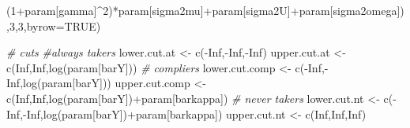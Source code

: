 \documentclass[
]{book}
\newenvironment{Shaded}{\begin{snugshade}}{\end{snugshade}}
\newcommand{\AttributeTok}[1]{\textcolor[rgb]{0.77,0.63,0.00}{#1}}
\newcommand{\CommentTok}[1]{\textcolor[rgb]{0.56,0.35,0.01}{\textit{#1}}}
\newcommand{\ConstantTok}[1]{\textcolor[rgb]{0.00,0.00,0.00}{#1}}
\newcommand{\DecValTok}[1]{\textcolor[rgb]{0.00,0.00,0.81}{#1}}
\newcommand{\FunctionTok}[1]{\textcolor[rgb]{0.00,0.00,0.00}{#1}}
\newcommand{\NormalTok}[1]{#1}
\newcommand{\OtherTok}[1]{\textcolor[rgb]{0.56,0.35,0.01}{#1}}
\newcommand{\SpecialCharTok}[1]{\textcolor[rgb]{0.00,0.00,0.00}{#1}}
\newcommand{\StringTok}[1]{\textcolor[rgb]{0.31,0.60,0.02}{#1}}
\theoremstyle{definition}
\theoremstyle{definition}
\theoremstyle{definition}
\theoremstyle{definition}
\theoremstyle{remark}
\begin{document}
\begin{Shaded}
\begin{Highlighting}[]
\NormalTok{                          (}\DecValTok{1}\SpecialCharTok{+}\NormalTok{param[}\StringTok{\textquotesingle{}gamma\textquotesingle{}}\NormalTok{]}\SpecialCharTok{\^{}}\DecValTok{2}\NormalTok{)}\SpecialCharTok{*}\NormalTok{param[}\StringTok{\textquotesingle{}sigma2mu\textquotesingle{}}\NormalTok{]}\SpecialCharTok{+}\NormalTok{param[}\StringTok{\textquotesingle{}sigma2U\textquotesingle{}}\NormalTok{]}\SpecialCharTok{+}\NormalTok{param[}\StringTok{\textquotesingle{}sigma2omega\textquotesingle{}}\NormalTok{]),}\DecValTok{3}\NormalTok{,}\DecValTok{3}\NormalTok{,}\AttributeTok{byrow=}\ConstantTok{TRUE}\NormalTok{)}



\CommentTok{\# cuts}
\CommentTok{\#always takers}
\NormalTok{lower.cut.at }\OtherTok{\textless{}{-}} \FunctionTok{c}\NormalTok{(}\SpecialCharTok{{-}}\ConstantTok{Inf}\NormalTok{,}\SpecialCharTok{{-}}\ConstantTok{Inf}\NormalTok{,}\SpecialCharTok{{-}}\ConstantTok{Inf}\NormalTok{)}
\NormalTok{upper.cut.at }\OtherTok{\textless{}{-}} \FunctionTok{c}\NormalTok{(}\ConstantTok{Inf}\NormalTok{,}\ConstantTok{Inf}\NormalTok{,}\FunctionTok{log}\NormalTok{(param[}\StringTok{\textquotesingle{}barY\textquotesingle{}}\NormalTok{]))}
\CommentTok{\# compliers}
\NormalTok{lower.cut.comp }\OtherTok{\textless{}{-}} \FunctionTok{c}\NormalTok{(}\SpecialCharTok{{-}}\ConstantTok{Inf}\NormalTok{,}\SpecialCharTok{{-}}\ConstantTok{Inf}\NormalTok{,}\FunctionTok{log}\NormalTok{(param[}\StringTok{\textquotesingle{}barY\textquotesingle{}}\NormalTok{]))}
\NormalTok{upper.cut.comp }\OtherTok{\textless{}{-}} \FunctionTok{c}\NormalTok{(}\ConstantTok{Inf}\NormalTok{,}\ConstantTok{Inf}\NormalTok{,}\FunctionTok{log}\NormalTok{(param[}\StringTok{\textquotesingle{}barY\textquotesingle{}}\NormalTok{])}\SpecialCharTok{+}\NormalTok{param[}\StringTok{\textquotesingle{}barkappa\textquotesingle{}}\NormalTok{])}
\CommentTok{\# never takers}
\NormalTok{lower.cut.nt }\OtherTok{\textless{}{-}} \FunctionTok{c}\NormalTok{(}\SpecialCharTok{{-}}\ConstantTok{Inf}\NormalTok{,}\SpecialCharTok{{-}}\ConstantTok{Inf}\NormalTok{,}\FunctionTok{log}\NormalTok{(param[}\StringTok{\textquotesingle{}barY\textquotesingle{}}\NormalTok{])}\SpecialCharTok{+}\NormalTok{param[}\StringTok{\textquotesingle{}barkappa\textquotesingle{}}\NormalTok{])}
\NormalTok{upper.cut.nt }\OtherTok{\textless{}{-}} \FunctionTok{c}\NormalTok{(}\ConstantTok{Inf}\NormalTok{,}\ConstantTok{Inf}\NormalTok{,}\ConstantTok{Inf}\NormalTok{)}


\end{Highlighting}
\end{Shaded}
\end{document}
